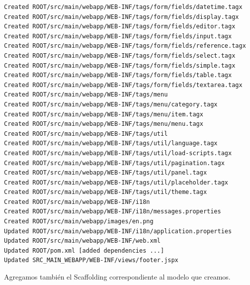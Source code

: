\documentclass[12pt]{article}
\begin{document}
\begin{enumerate}
\begin{lstlisting}[frame=single]
Created ROOT/src/main/webapp/WEB-INF/tags/form/fields/datetime.tagx
Created ROOT/src/main/webapp/WEB-INF/tags/form/fields/display.tagx
Created ROOT/src/main/webapp/WEB-INF/tags/form/fields/editor.tagx
Created ROOT/src/main/webapp/WEB-INF/tags/form/fields/input.tagx
Created ROOT/src/main/webapp/WEB-INF/tags/form/fields/reference.tagx
Created ROOT/src/main/webapp/WEB-INF/tags/form/fields/select.tagx
Created ROOT/src/main/webapp/WEB-INF/tags/form/fields/simple.tagx
Created ROOT/src/main/webapp/WEB-INF/tags/form/fields/table.tagx
Created ROOT/src/main/webapp/WEB-INF/tags/form/fields/textarea.tagx
Created ROOT/src/main/webapp/WEB-INF/tags/menu
Created ROOT/src/main/webapp/WEB-INF/tags/menu/category.tagx
Created ROOT/src/main/webapp/WEB-INF/tags/menu/item.tagx
Created ROOT/src/main/webapp/WEB-INF/tags/menu/menu.tagx
Created ROOT/src/main/webapp/WEB-INF/tags/util
Created ROOT/src/main/webapp/WEB-INF/tags/util/language.tagx
Created ROOT/src/main/webapp/WEB-INF/tags/util/load-scripts.tagx
Created ROOT/src/main/webapp/WEB-INF/tags/util/pagination.tagx
Created ROOT/src/main/webapp/WEB-INF/tags/util/panel.tagx
Created ROOT/src/main/webapp/WEB-INF/tags/util/placeholder.tagx
Created ROOT/src/main/webapp/WEB-INF/tags/util/theme.tagx
Created ROOT/src/main/webapp/WEB-INF/i18n
Created ROOT/src/main/webapp/WEB-INF/i18n/messages.properties
Created ROOT/src/main/webapp/images/en.png
Updated ROOT/src/main/webapp/WEB-INF/i18n/application.properties
Updated ROOT/src/main/webapp/WEB-INF/web.xml
Updated ROOT/pom.xml [added dependencies ...]
Updated SRC_MAIN_WEBAPP/WEB-INF/views/footer.jspx
\end{lstlisting}

Agregamos también el Scaffolding correspondiente al modelo que creamos.


\end{enumerate}
\end{document}
